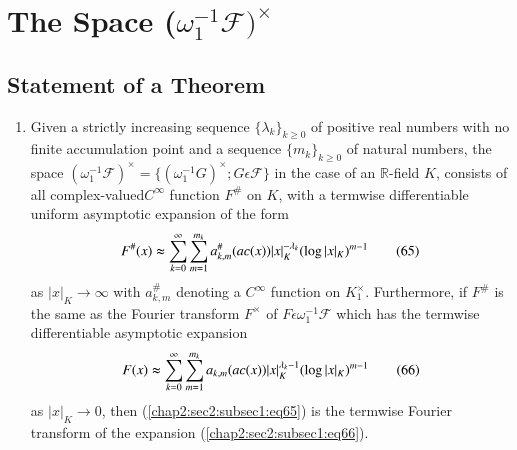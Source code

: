 \section{The Space
  ($\omega_{1}^{-1}\mathscr{F})^{\times}$}\label{chap2:sec2}  %

\subsection{Statement of a Theorem}\label{chap2:sec2:subsec1} %

\begin{enumerate}
\renewcommand{\theenumi}{\Alph{enumi}}
\renewcommand{\labelenumi}{(\theenumi)}
\item  Given a strictly increasing sequence $\{\lambda_{k}\}_{k\ge 0}$ of
positive real numbers with no finite accumulation point and a sequence
$\{m_{k}\}_{k\ge 0}$ of natural numbers, the space
$(\omega_{1}^{-1}\mathscr{F})^{\times}=\{(\omega_{1}^{-1}G)^{\times};G\epsilon
\mathscr{F}\}$ in  the case of an $\mathbb{R}$-field $K$, consists of
all complex-valued\pageoriginale $C^{\infty}$ function $F^{\#}$ on $K$, with a
termwise differentiable uniform asymptotic expansion of the form
\begin{equation*}
  F^{\#}(x)\thickapprox \sum\limits_{k=0}^{\infty}
  \sum\limits_{m=1}^{m_{k}}a_{k,m}^{\#}(ac(x))|x|_{K}^{-\lambda_{k}}
  (\log|x|_{K})^{m-1}\tag{65}\label{chap2:sec2:subsec1:eq65}
\end{equation*}
as $|x|_{K}\rightarrow \infty$ with $a_{k,m}^{\#}$ denoting a
$C^{\infty}$ function on $K_{1}^{\times}$. Furthermore, if $F^{\#}$ is
the same as the Fourier transform $F^{\times}$ of
$F\epsilon\omega_{1}^{-1}\mathscr{F}$ which has the termwise
differentiable asymptotic expansion 
\begin{equation*}
F(x)\thickapprox
\sum\limits_{k=0}^{\infty}\sum\limits_{m=1}^{m_{k}}a_{k,m}(ac(x))|x|_{K}^{\lambda_{k}-1}(\log |x|_{K})^{m-1}\tag{66}\label{chap2:sec2:subsec1:eq66}
\end{equation*}
as $|x|_{K}\rightarrow 0$, then (\ref{chap2:sec2:subsec1:eq65}) is the
termwise Fourier transform of the expansion (\ref{chap2:sec2:subsec1:eq66}). 


\end{enumerate}

